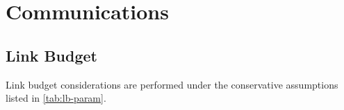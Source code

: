 \clearpage

\setcounter{figure}{0}
\setcounter{table}{0}

\section{Communications} 
\label{sec:AppendixCOM}

\subsection{Link Budget}
\label{app:LinkBudget}

Link budget considerations are performed under the conservative assumptions listed in \autoref{tab:lb-param}. \\

